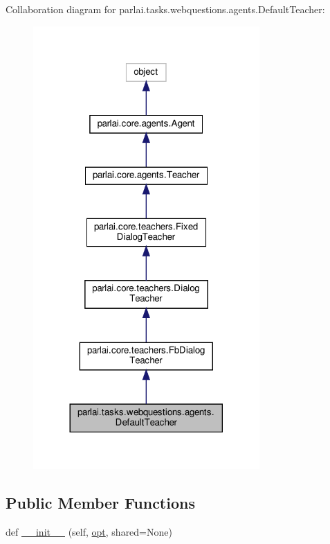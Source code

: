 Collaboration diagram for parlai.\+tasks.\+webquestions.\+agents.\+Default\+Teacher\+:\nopagebreak
\begin{figure}[H]
\begin{center}
\leavevmode
\includegraphics[width=245pt]{d6/d11/classparlai_1_1tasks_1_1webquestions_1_1agents_1_1DefaultTeacher__coll__graph}
\end{center}
\end{figure}
\subsection*{Public Member Functions}
\begin{DoxyCompactItemize}
\item 
def \hyperlink{classparlai_1_1tasks_1_1webquestions_1_1agents_1_1DefaultTeacher_a5206081c0932010aa0cb6ac15eb51ed1}{\+\_\+\+\_\+init\+\_\+\+\_\+} (self, \hyperlink{classparlai_1_1core_1_1teachers_1_1FbDialogTeacher_af7a9ec497b9cd0292d7b8fa220da7c28}{opt}, shared=None)
\end{DoxyCompactItemize}
